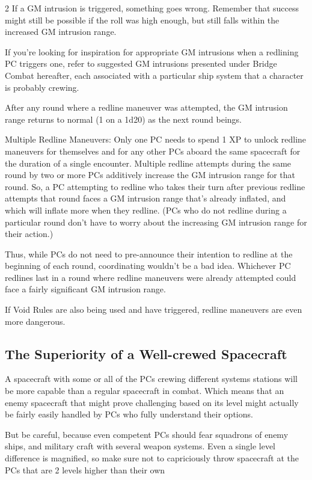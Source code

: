 \begin{multicols}{2}
If a GM intrusion is triggered, something goes wrong. Remember that success might still be possible if the roll was high enough, but still falls within the increased GM intrusion range.

If you’re looking for inspiration for appropriate GM intrusions when a redlining PC triggers one, refer to suggested GM intrusions presented under Bridge Combat hereafter, each associated with a particular ship system that a character is probably crewing. 

After any round where a redline maneuver was attempted, the GM intrusion range returns to normal (1 on a 1d20) as the next round beings. 

Multiple Redline Maneuvers: Only one PC needs to spend 1 XP to unlock redline maneuvers for themselves and for any other PCs aboard the same spacecraft for the duration of a single encounter. Multiple redline attempts during the same round by two or more PCs additively increase the GM intrusion range for that round. So, a PC attempting to redline who takes their turn after previous redline attempts that round faces a GM intrusion range that’s already inflated, and which will inflate more when they redline. (PCs who do not redline during a particular round don’t have to worry about the increasing GM intrusion range for their action.)

Thus, while PCs do not need to pre-announce their intention to redline at the beginning of each round, coordinating wouldn’t be a bad idea. Whichever PC redlines last in a round where redline maneuvers were already attempted could face a fairly significant GM intrusion range. 

If Void Rules are also being used and have triggered, redline maneuvers are even more dangerous.

\subsection{The Superiority of a Well-crewed Spacecraft}

A spacecraft with some or all of the PCs crewing different systems stations will be more capable than a regular spacecraft in combat. Which means that an enemy spacecraft that might prove challenging based on its level might actually be fairly easily handled by PCs who fully understand their options. 

But be careful, because even competent PCs should fear squadrons of enemy ships, and military craft with several weapon systems. Even a single level difference is magnified, so make sure not to capriciously throw spacecraft at the PCs that are 2 levels higher than their own


\end{multicols}
